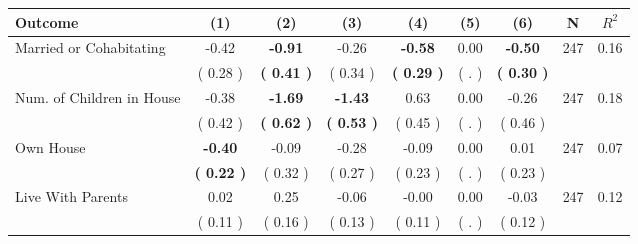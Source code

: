 \begin{tabular}{lcccccccc}
\toprule
 \textbf{Outcome} & \textbf{(1)} & \textbf{(2)} & \textbf{(3)} & \textbf{(4)} & \textbf{(5)} & \textbf{(6)} & \textbf{N} & \textbf{$ R^2$} \\
\midrule
Married or Cohabitating &     -0.42 & \textbf{    -0.91} &     -0.26 & \textbf{    -0.58} &      0.00 & \textbf{    -0.50} & 247 &       0.16 \\ 
 & (     0.28 ) & \textbf{(     0.41 )} & (     0.34 ) & \textbf{(     0.29 )} & (        . ) & \textbf{(     0.30 )} & \\
Num. of Children in House &     -0.38 & \textbf{    -1.69} & \textbf{    -1.43} &      0.63 &      0.00 &     -0.26 & 247 &       0.18 \\ 
 & (     0.42 ) & \textbf{(     0.62 )} & \textbf{(     0.53 )} & (     0.45 ) & (        . ) & (     0.46 ) & \\
Own House & \textbf{    -0.40} &     -0.09 &     -0.28 &     -0.09 &      0.00 &      0.01 & 247 &       0.07 \\ 
 & \textbf{(     0.22 )} & (     0.32 ) & (     0.27 ) & (     0.23 ) & (        . ) & (     0.23 ) & \\
Live With Parents &      0.02 &      0.25 &     -0.06 &     -0.00 &      0.00 &     -0.03 & 247 &       0.12 \\ 
 & (     0.11 ) & (     0.16 ) & (     0.13 ) & (     0.11 ) & (        . ) & (     0.12 ) & \\
\bottomrule
\end{tabular}
